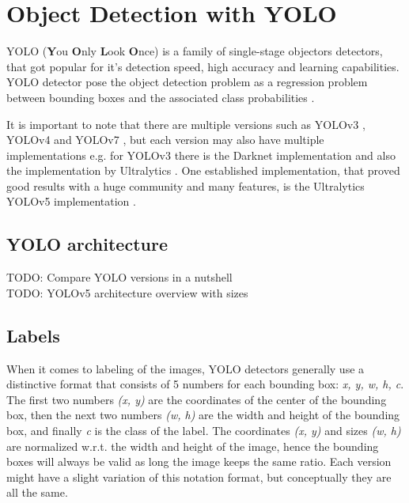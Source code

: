 \section{Object Detection with YOLO}
YOLO (\textbf{Y}ou \textbf{O}nly \textbf{L}ook \textbf{O}nce) is a family of single-stage objectors detectors, that got popular for it's detection speed, high accuracy and learning capabilities. YOLO detector pose the object detection problem as a regression problem between bounding boxes and the associated class probabilities \cite{yolov1_paper}.

It is important to note that there are multiple versions such as
YOLOv3 \cite{yolov3_paper}, YOLOv4 \cite{yolov4_paper} and YOLOv7 \cite{yolov7_paper}, but each version may also have multiple implementations e.g. for YOLOv3 there is the Darknet implementation \cite{darknet_git} and also the implementation by Ultralytics \cite{yolov3_ultralytics_git}. One established implementation, that proved good results with a huge community and many features, is the Ultralytics YOLOv5 implementation \cite{yolov5_git}.


\subsection{YOLO architecture}
TODO: Compare YOLO versions in a nutshell \\
TODO: YOLOv5 architecture overview with sizes

\subsection{Labels}
When it comes to labeling of the images, YOLO detectors generally use a distinctive format that consists of 5 numbers for each bounding box: \textit{x, y, w, h, c}. The first two numbers \textit{(x, y)} are the coordinates of the center of the bounding box, then the next two numbers \textit{(w, h)} are the width and height of the bounding box, and finally \textit{c} is the class of the label. The coordinates \textit{(x, y)} and sizes \textit{(w, h)} are normalized w.r.t. the width and height of the image, hence the bounding boxes will always be valid as long the image keeps the same ratio. Each version might have a slight variation of this notation format, but conceptually they are all the same.

